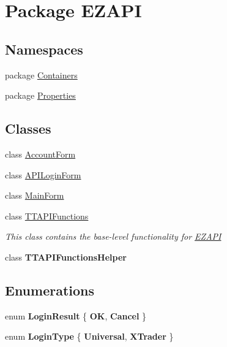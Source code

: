 \hypertarget{namespace_e_z_a_p_i}{\section{Package E\-Z\-A\-P\-I}
\label{namespace_e_z_a_p_i}
}
\subsection*{Namespaces}
\begin{DoxyCompactItemize}
\item 
package \hyperlink{namespace_e_z_a_p_i_1_1_containers}{Containers}
\item 
package \hyperlink{namespace_e_z_a_p_i_1_1_properties}{Properties}
\end{DoxyCompactItemize}
\subsection*{Classes}
\begin{DoxyCompactItemize}
\item 
class \hyperlink{class_e_z_a_p_i_1_1_account_form}{Account\-Form}
\item 
class \hyperlink{class_e_z_a_p_i_1_1_a_p_i_login_form}{A\-P\-I\-Login\-Form}
\item 
class \hyperlink{class_e_z_a_p_i_1_1_main_form}{Main\-Form}
\item 
class \hyperlink{class_e_z_a_p_i_1_1_t_t_a_p_i_functions}{T\-T\-A\-P\-I\-Functions}
\begin{DoxyCompactList}\small\item\em This class contains the base-\/level functionality for \hyperlink{namespace_e_z_a_p_i}{E\-Z\-A\-P\-I} \end{DoxyCompactList}\item 
class {\bfseries T\-T\-A\-P\-I\-Functions\-Helper}
\end{DoxyCompactItemize}
\subsection*{Enumerations}
\begin{DoxyCompactItemize}
\item 
enum {\bfseries Login\-Result} \{ {\bfseries O\-K}, 
{\bfseries Cancel}
 \}
\item 
enum {\bfseries Login\-Type} \{ {\bfseries Universal}, 
{\bfseries X\-Trader}
 \}
\end{DoxyCompactItemize}
